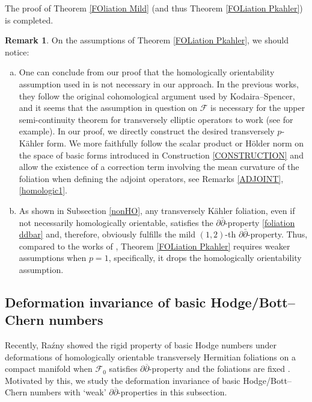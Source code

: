 \documentclass[12pt]{amsart}
\numberwithin{equation}{section}
\theoremstyle{definition}
\theoremstyle{definition}
\theoremstyle{definition}
\newtheorem{remark}  [theorem]     {Remark}
\renewcommand{\1}{\mathsf{1}}
\renewcommand{\>}{\rightarrow}
\newcommand{\p}{\partial}
\newcommand{\bp}{\overline\partial}
\def\p{\partial}
\def\mc{\mathcal}
\theoremstyle{plain} %
\theoremstyle{plain} %
\theoremstyle{plain} %
\begin{document}
	The proof of  Theorem \ref{FOliation Mild} (and thus  Theorem \ref{FOLiation Pkahler}) is completed.
	
	
	
	\begin{remark}\label{Non} On the assumptions of Theorem \ref{FOLiation Pkahler}, we should notice:
		\begin{enumerate}[(a)]
			\item 	\label{AAA}	 One can conclude from our proof that the homologically orientability assumption used in \cite{EKAG97,Ra21} is not necessary in our approach. In the previous works,  they  follow the original cohomological
			argument used by Kodaira--Spencer, and  it seems that the assumption  in question on $\mc F$ is necessary for the upper semi-continuity theorem for  transversely  elliptic operators  to work (see \cite[Remark 4.6]{Ra21} for example). In our proof,   we directly construct the  desired transversely $p$-K\"ahler form.  We more faithfully follow the scalar product or H\"older norm on the space of basic forms introduced in Construction \ref{CONSTRUCTION} and allow the existence of a correction term involving the mean curvature of the foliation when defining the adjoint operators, see Remarks \ref{ADJOINT}, \ref{homologic1}.
			
			\item  \label{BBB}As shown in Subsection \ref{nonHO}, any transversely K\"ahler foliation, even if not necessarily homologically orientable, satisfies the $\partial\bar{\partial}$-property \eqref{foliation ddbar} and, therefore, obviously fulfills the mild $(1,2)$-th $\partial\bar{\partial}$-property. Thus, compared to the works of \cite{EKAG97,Ra21}, Theorem \ref{FOLiation Pkahler} requires weaker assumptions when $p=1$, specifically, it drops the homologically orientability assumption.
		\end{enumerate}
	\end{remark}
	
	\subsection{Deformation invariance of basic Hodge/Bott--Chern numbers}\label{defor}Recently, Ra\'zny  showed the rigid property of basic Hodge numbers under deformations of homologically orientable transversely Hermitian foliations on a compact manifold when $\mc F_0$ satisfies $\p\bp$-property and the foliations are fixed \cite[Corollary 5.3]{Ra21}. Motivated by this, we study the deformation invariance of basic Hodge/Bott--Chern numbers with `weak' $\p\bp$-properties in this subsection.
	
\end{document}
